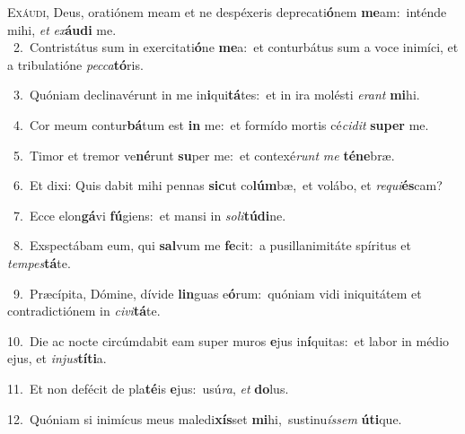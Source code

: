 \lettrine{\initial\textcolor{\initialcolor}{E}}{xáudi,} Deus, oratiónem meam et ne despéxeris deprecati\-\textbf{ó}\-nem \textbf{me}\-am:~\star inténde mihi, \textit{et} \textit{ex}\-\textbf{áu}\textbf{di} me.\\
{\numbfont\textcolor{\numbcolor}{~2.}}~Contristátus sum in exercitati\-\textbf{ó}\-ne \textbf{me}\-a:~\star et conturbátus sum a voce inimíci, et a tribulatióne \textit{pec}\-\textit{ca}\textbf{tó}ris.\par
{\numbfont\textcolor{\numbcolor}{~3.}}~Quóniam declinavérunt in me in\-\textbf{i}\-qui\-\textbf{tá}\-tes:~\star et in ira molésti \textit{e}\-\textit{rant} \textbf{mi}\-hi.\par
{\numbfont\textcolor{\numbcolor}{~4.}}~Cor meum contur\-\textbf{bá}\-tum est \textbf{in} me:~\star et formído mortis cé\-\textit{ci}\-\textit{dit} \textbf{su}\-\textbf{per} me.\par
{\numbfont\textcolor{\numbcolor}{~5.}}~Timor et tremor ve\-\textbf{né}\-runt \textbf{su}\-per me:~\star et contexé\textit{runt} \textit{me} \textbf{té}\-\textbf{ne}bræ.\par
{\numbfont\textcolor{\numbcolor}{~6.}}~Et dixi: Quis dabit mihi pennas \textbf{sic}\-ut co\-\textbf{lúm}\-bæ,~\star et volábo, et \textit{re}\-\textit{qui}\textbf{és}cam?\par
{\numbfont\textcolor{\numbcolor}{~7.}}~Ecce elon\-\textbf{gá}\-vi \textbf{fú}\-giens:~\star et mansi in \textit{so}\-\textit{li}\textbf{tú}\textbf{di}ne.\par
{\numbfont\textcolor{\numbcolor}{~8.}}~Exspectábam eum, qui \textbf{sal}\-vum me \textbf{fe}\-cit:~\star a pusillanimitáte spíritus et \textit{tem}\-\textit{pes}\textbf{tá}te.\par
{\numbfont\textcolor{\numbcolor}{~9.}}~Præcípita, Dómine, dívide \textbf{lin}\-guas e\-\textbf{ó}\-rum:~\star quóniam vidi iniquitátem et contradictiónem in \textit{ci}\-\textit{vi}\textbf{tá}te.\par
{\numbfont\textcolor{\numbcolor}{10.}}~Die ac nocte circúmdabit eam super muros \textbf{e}\-jus in\-\textbf{í}\-quitas:~\star et labor in médio ejus, et \textit{in}\-\textit{jus}\textbf{tí}\textbf{ti}a.\par
{\numbfont\textcolor{\numbcolor}{11.}}~Et non defécit de pla\-\textbf{té}\-is \textbf{e}\-jus:~\star usú\-\textit{ra}\-, \textit{et} \textbf{do}\-lus.\par
{\numbfont\textcolor{\numbcolor}{12.}}~Quóniam si inimícus meus maledi\-\textbf{xís}\-set \textbf{mi}\-hi,~\star sustinu\-\textit{ís}\-\textit{sem} \textbf{ú}\-\textbf{ti}que.\par
